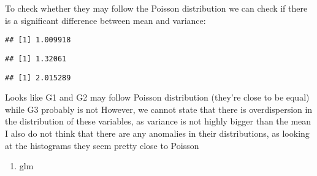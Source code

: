 \documentclass[
]{article}
\newenvironment{Shaded}{\begin{snugshade}}{\end{snugshade}}
\newcommand{\FunctionTok}[1]{\textcolor[rgb]{0.13,0.29,0.53}{\textbf{#1}}}
\newcommand{\NormalTok}[1]{#1}
\newcommand{\SpecialCharTok}[1]{\textcolor[rgb]{0.81,0.36,0.00}{\textbf{#1}}}
\providecommand{\tightlist}{%
  \setlength{\itemsep}{0pt}\setlength{\parskip}{0pt}}
\begin{document}
To check whether they may follow the Poisson distribution we can check
if there is a significant difference between mean and variance:

\begin{Shaded}
\end{Shaded}

\begin{verbatim}
## [1] 1.009918
\end{verbatim}

\begin{Shaded}
\end{Shaded}

\begin{verbatim}
## [1] 1.32061
\end{verbatim}

\begin{Shaded}
\end{Shaded}

\begin{verbatim}
## [1] 2.015289
\end{verbatim}

Looks like G1 and G2 may follow Poisson distribution (they're close to
be equal) while G3 probably is not However, we cannot state that there
is overdispersion in the distribution of these variables, as variance is
not highly bigger than the mean I also do not think that there are any
anomalies in their distributions, as looking at the histograms they seem
pretty close to Poisson

\begin{enumerate}
\def\labelenumi{\alph{enumi}.}
\setcounter{enumi}{1}
\tightlist
\item
  glm
\end{enumerate}
\end{document}
